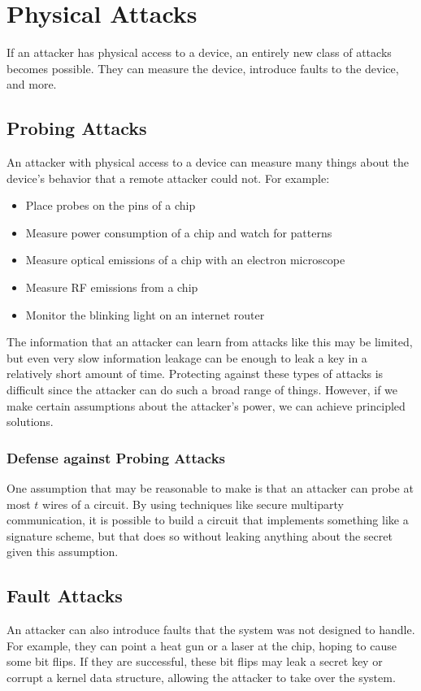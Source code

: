 \section{Physical Attacks}
If an attacker has physical access to a device, an entirely new class of attacks becomes possible. They can measure the device, introduce faults to the device, and more.

\subsection{Probing Attacks}
An attacker with physical access to a device can measure many things about the device's behavior that a remote attacker could not. For example:
\begin{itemize}
	\item Place probes on the pins of a chip
	\item Measure power consumption of a chip and watch for patterns
	\item Measure optical emissions of a chip with an electron microscope
	\item Measure RF emissions from a chip
	\item Monitor the blinking light on an internet router
\end{itemize}

The information that an attacker can learn from attacks like this may be limited, but even very slow information leakage can be enough to leak a key in a relatively short amount of time. Protecting against these types of attacks is difficult since the attacker can do such a broad range of things. However, if we make certain assumptions about the attacker's power, we can achieve principled solutions. 

\subsubsection{Defense against Probing Attacks}
One assumption that may be reasonable to make is that an attacker can probe at most $t$ wires of a circuit. By using techniques like secure multiparty communication, it is possible to build a circuit that implements something like a signature scheme, but that does so without leaking anything about the secret given this assumption.

\subsection{Fault Attacks}
An attacker can also introduce faults that the system was not designed to handle. For example, they can point a heat gun or a laser at the chip, hoping to cause some bit flips. If they are successful, these bit flips may leak a secret key or corrupt a kernel data structure, allowing the attacker to take over the system.

